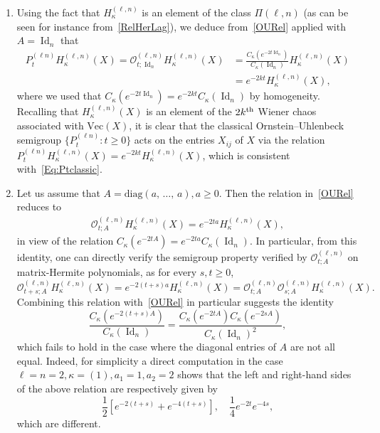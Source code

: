 \documentclass[AHL,Unicode,longabstracts,published]{cedram}
\DeclareMathOperator{\Id}{Id}
\newcommand{\diag}{\mathrm{diag}}
\renewcommand{\Vec}{\mathrm{Vec}}
\newcommand{\clO}{\mathcal{O}}
\newcommand*{\alphenumi}{\renewcommand*{\theenumi}{\alph{enumi}}}
\begin{document}
\begin{rema}\label{RemOU}\leavevmode
\begin{enumerate}\alphenumi
\item Using the fact that $H_{\kappa}^{(\ell,n)}$ is an element of the class $\Pi(\ell,n)$ (as can be seen for instance from~\eqref{RelHerLag}), we deduce from~\eqref{OURel} applied with $A=\Id_n$ that
\begin{equation}\label{Eq:Ptclassic}
\begin{split}
P_t^{(\ell n)} H_{\kappa}^{(\ell,n)}(X) =\clO_{t;\Id_n}^{(\ell,n)} H_{\kappa}^{(\ell,n)}(X) &= \frac{C_{\kappa}\left(e^{-2t\Id_n}\right)}{C_{\kappa}(\Id_n)} H_{\kappa}^{(\ell,n)}(X) \\
&= e^{-2kt} H_{\kappa}^{(\ell,n)}(X),
\end{split}
\end{equation}
where we used that $C_{\kappa}(e^{-2t\Id_n})=e^{-2kt}C_{\kappa}(\Id_n)$ by homogeneity. Recalling that $H_{\kappa}^{(\ell,n)}(X)$ is an element of the $2k^{\rm th}$ Wiener chaos associated with $\Vec(X)$, it is clear that the classical Ornstein--Uhlenbeck semigroup $\{P_t^{(\ell n)}:t\geq0\}$ acts on the entries $X_{ij}$ of $X$ via the relation $P_t^{(\ell n)} H_{\kappa}^{(\ell,n)}(X) = e^{-2kt} H_{\kappa}^{(\ell,n)}(X)$, which is consistent with~\eqref{Eq:Ptclassic}.
\item\label{rema3.11.b} Let us assume that $A=\diag(a,\,\ldots,\,a), a\geq0$. Then the relation in~\eqref{OURel} reduces to
\begin{gather*}
\clO_{t;A}^{(\ell,n)}H_{\kappa}^{(\ell,n)}(X) = e^{-2ta}H_{\kappa}^{(\ell,n)}(X),
\end{gather*}
in view of the relation $C_{\kappa}(e^{-2tA}) = e^{-2ta}C_{\kappa}(\Id_n)$. In particular, from this identity, one can directly verify the semigroup property verified by $\clO_{t;A}^{(\ell,n)}$ on matrix-Hermite polynomials, as for every $s,t\geq 0$,
\[
\clO_{t+s;A}^{(\ell,n)} H_{\kappa}^{(\ell,n)}(X) = e^{-2(t+s)a}H_{\kappa}^{(\ell,n)}(X) = \clO_{t;A}^{(\ell,n)} \clO_{s;A}^{(\ell,n)} H_{\kappa}^{(\ell,n)}(X).
\]
Combining this relation with~\eqref{OURel} in particular suggests the identity
\[
\frac{C_{\kappa}\left(e^{-2(t+s)A}\right)}{C_{\kappa}(\Id_n)} = \frac{C_{\kappa}\left(e^{-2tA}\right)C_{\kappa}\left(e^{-2sA}\right)}{C_{\kappa}(\Id_n)^2},
\]
which fails to hold in the case where the diagonal entries of $A$ are not all equal. Indeed, for simplicity a direct computation in the case $\ell=n=2, \kappa=(1), a_1=1, a_2=2$ shows that the left and right-hand sides of the above relation are respectively given by
\[
\frac{1}{2} \left[e^{-2(t+s)} + e^{-4(t+s)}\right], \quad
\frac{1}{4} e^{-2t} e^{-4s},
\]
which are different.
\end{enumerate}
\end{rema}
\end{document}
